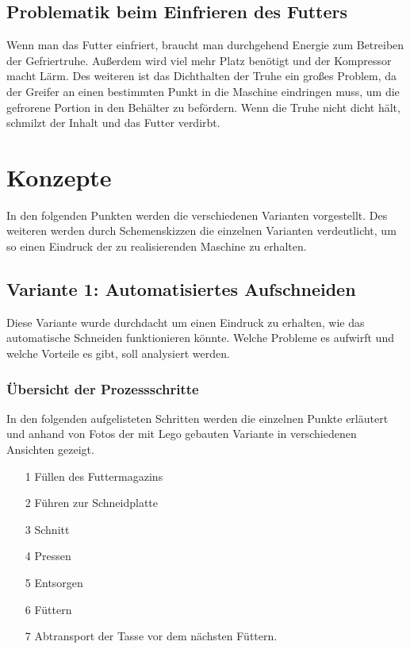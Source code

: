 \subsection{Problematik beim Einfrieren des Futters}

Wenn man das Futter einfriert, braucht man durchgehend Energie zum Betreiben der Gefriertruhe. Außerdem wird viel mehr Platz benötigt und der Kompressor macht Lärm. Des weiteren ist das Dichthalten der Truhe ein großes Problem, da der Greifer an einen bestimmten Punkt in die Maschine eindringen muss, um die gefrorene Portion in den Behälter zu befördern. Wenn die Truhe nicht dicht hält, schmilzt der Inhalt und das Futter verdirbt.

\section{Konzepte} 

In den folgenden Punkten werden die verschiedenen Varianten vorgestellt. Des weiteren werden durch Schemenskizzen die einzelnen Varianten verdeutlicht, um so einen Eindruck der zu realisierenden Maschine zu erhalten.

\subsection{Variante 1: Automatisiertes Aufschneiden} 

Diese Variante wurde durchdacht um einen Eindruck zu erhalten, wie das automatische Schneiden funktionieren könnte. Welche Probleme es aufwirft und welche Vorteile es gibt, soll analysiert werden.

\subsubsection{Übersicht der Prozessschritte}

In den folgenden aufgelisteten Schritten werden die einzelnen Punkte erläutert und anhand von Fotos der mit Lego gebauten Variante in verschiedenen Ansichten gezeigt.

\begin{itemize}
\item[1] Füllen des Futtermagazins
\item[2] Führen zur Schneidplatte
\item[3] Schnitt
\item[4] Pressen
\item[5] Entsorgen
\item[6] Füttern
\item[7] Abtransport der Tasse vor dem nächsten Füttern.
\end{itemize}


